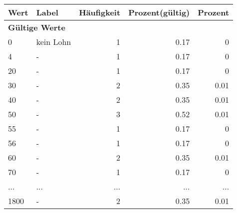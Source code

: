      \begin{longtable}{lXrrr}
     \toprule
     \textbf{Wert} & \textbf{Label} & \textbf{Häufigkeit} & \textbf{Prozent(gültig)} & \textbf{Prozent} \\
     \endhead
     \midrule
     \multicolumn{5}{l}{\textbf{Gültige Werte}}\\
        0 & \multicolumn{1}{X}{kein Lohn} & %
          \num{1} &
          \num[round-mode=places,round-precision=2]{0,17} &
          \num[round-mode=places,round-precision=2]{0} \\
        4 & \multicolumn{1}{X}{-} & %
          \num{1} &
          \num[round-mode=places,round-precision=2]{0,17} &
          \num[round-mode=places,round-precision=2]{0} \\
        20 & \multicolumn{1}{X}{-} & %
          \num{1} &
          \num[round-mode=places,round-precision=2]{0,17} &
          \num[round-mode=places,round-precision=2]{0} \\
        30 & \multicolumn{1}{X}{-} & %
          \num{2} &
          \num[round-mode=places,round-precision=2]{0,35} &
          \num[round-mode=places,round-precision=2]{0,01} \\
        40 & \multicolumn{1}{X}{-} & %
          \num{2} &
          \num[round-mode=places,round-precision=2]{0,35} &
          \num[round-mode=places,round-precision=2]{0,01} \\
        50 & \multicolumn{1}{X}{-} & %
          \num{3} &
          \num[round-mode=places,round-precision=2]{0,52} &
          \num[round-mode=places,round-precision=2]{0,01} \\
        55 & \multicolumn{1}{X}{-} & %
          \num{1} &
          \num[round-mode=places,round-precision=2]{0,17} &
          \num[round-mode=places,round-precision=2]{0} \\
        56 & \multicolumn{1}{X}{-} & %
          \num{1} &
          \num[round-mode=places,round-precision=2]{0,17} &
          \num[round-mode=places,round-precision=2]{0} \\
        60 & \multicolumn{1}{X}{-} & %
          \num{2} &
          \num[round-mode=places,round-precision=2]{0,35} &
          \num[round-mode=places,round-precision=2]{0,01} \\
        70 & \multicolumn{1}{X}{-} & %
          \num{1} &
          \num[round-mode=places,round-precision=2]{0,17} &
          \num[round-mode=places,round-precision=2]{0} \\
       ... & ... & ... & ... & ... \\
        1800 & \multicolumn{1}{X}{-} & %
          \num{2} &
          \num[round-mode=places,round-precision=2]{0,35} &
          \num[round-mode=places,round-precision=2]{0,01} \\


\end{longtable}
